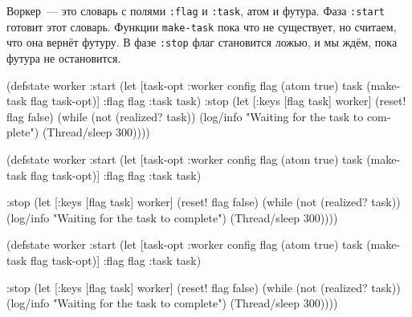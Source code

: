 \fi

Воркер~--- это словарь с полями \verb|:flag| и \verb|:task|, атом и футура. Фаза
\verb|:start| готовит этот словарь. Функции \verb|make-task| пока что не
существует, но считаем, что она вернёт футуру. В фазе \verb|:stop| флаг
становится ложью, и мы ждём, пока футура не остановится.


\ifnarrow

\begin{english}
  \begin{clojure}
(defstate worker
  :start
  (let [{task-opt :worker} config
        flag (atom true)
        task (make-task flag task-opt)]
    {:flag flag :task task})
  :stop
  (let [{:keys [flag task]} worker]
    (reset! flag false)
    (while (not (realized? task))
      (log/info
      "Waiting for the task
                to complete")
      (Thread/sleep 300))))
  \end{clojure}
\end{english}

\else

\ifafive

\begin{english}
  \begin{clojure}
(defstate worker
  :start
  (let [{task-opt :worker} config
        flag (atom true)
        task (make-task flag task-opt)]
    {:flag flag :task task})
  \end{clojure}
\end{english}

\pagebreak

\begin{english}
  \begin{clojure}
  :stop
  (let [{:keys [flag task]} worker]
    (reset! flag false)
    (while (not (realized? task))
      (log/info "Waiting for the task to complete")
      (Thread/sleep 300))))
  \end{clojure}
\end{english}

\else

\begin{english}
  \begin{clojure}
(defstate worker
  :start
  (let [{task-opt :worker} config
        flag (atom true)
        task (make-task flag task-opt)]
    {:flag flag :task task})

  :stop
  (let [{:keys [flag task]} worker]
    (reset! flag false)
    (while (not (realized? task))
      (log/info "Waiting for the task to complete")
      (Thread/sleep 300))))
  \end{clojure}
\end{english}

